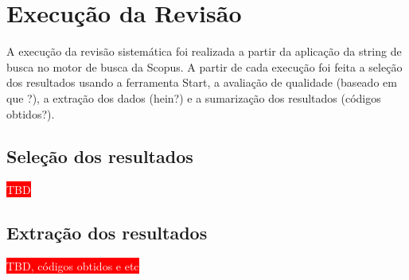 \chapter{\label{chap:chap5}{Execução da Revisão}}

A execução da revisão sistemática foi realizada a partir da aplicação da string de busca no motor de busca da Scopus. A partir de cada execução foi feita a seleção dos resultados usando a ferramenta Start, a avaliação de qualidade (baseado em que ?), a extração dos dados (hein?) e a sumarização dos resultados (códigos obtidos?).

\section{Seleção dos resultados}

\textcolor{white}{\colorbox{red}{TBD}}

\section{Extração dos resultados}

\textcolor{white}{\colorbox{red}{TBD, códigos obtidos e etc}}
